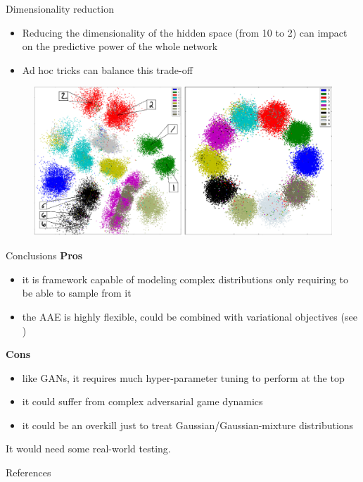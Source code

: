 \documentclass[10pt]{beamer}
\begin{document}
\begin{frame}{Dimensionality reduction}
\begin{itemize}
  \item Reducing the dimensionality of the hidden space (from 10 to 2) can impact on the predictive power of the whole network
  \item Ad hoc tricks can balance this trade-off
\end{itemize}
\begin{figure}
  \centering
  \includegraphics[width=\linewidth]{../images/dim_reduction-scatter-01.png}
\end{figure}
\end{frame}

\begin{frame}{Conclusions}
\textbf{Pros}
\begin{itemize}
  \item it is framework capable of modeling complex distributions only requiring to be able to sample from it
  \item the AAE is highly flexible, could be combined with variational objectives (see \cite{rosca2017variational})
\end{itemize}

\textbf{Cons}
\begin{itemize}
  \item like GANs, it requires much hyper-parameter tuning to perform at the top
  \item it could suffer from complex adversarial game dynamics
  \item it could be an overkill just to treat Gaussian/Gaussian-mixture distributions
\end{itemize}

{\footnotesize * It would need some real-world testing.}
\end{frame}

\begin{frame}{References}
\nocite{bengio2013better}
\nocite{bengio2014deep}
\nocite{goodfellow2014generative}
\nocite{kingma2013auto}
\nocite{maaloe2016auxiliary}
\nocite{li2015generative}

\printbibliography
\end{frame}
\end{document}
